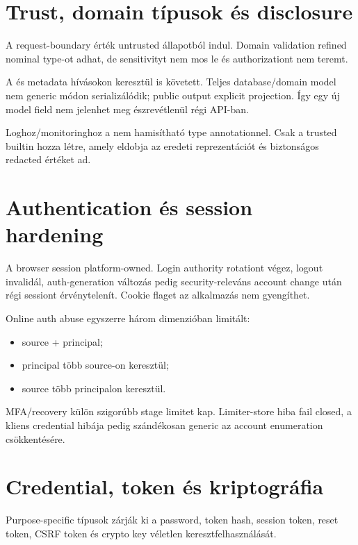 \section{Trust, domain típusok és disclosure}

A request-boundary érték untrusted állapotból indul. Domain validation refined nominal type-ot adhat, de sensitivityt nem mos le és authorizationt nem teremt.

A  és  metadata hívásokon keresztül is követett. Teljes database/domain model nem generic módon serializálódik; public output explicit projection. Így egy új model field nem jelenhet meg észrevétlenül régi API-ban.

Loghoz/monitoringhoz a  nem hamisítható type annotationnel. Csak a trusted  builtin hozza létre, amely eldobja az eredeti reprezentációt és biztonságos redacted értéket ad.

\section{Authentication és session hardening}

A browser session platform-owned. Login authority rotationt végez, logout invalidál, auth-generation változás pedig security-releváns account change után régi sessiont érvénytelenít. Cookie flaget az alkalmazás nem gyengíthet.

Online auth abuse egyszerre három dimenzióban limitált:

\begin{itemize}
  \item source + principal;
  \item principal több source-on keresztül;
  \item source több principalon keresztül.
\end{itemize}

MFA/recovery külön szigorúbb stage limitet kap. Limiter-store hiba fail closed, a kliens credential hibája pedig szándékosan generic az account enumeration csökkentésére.

\section{Credential, token és kriptográfia}

Purpose-specific típusok zárják ki a password, token hash, session token, reset token, CSRF token és crypto key véletlen keresztfelhasználását.

